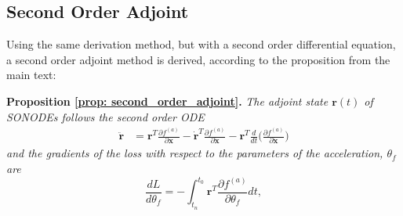 \documentclass{article}
\theoremstyle{remark}
\theoremstyle{definition}
\begin{document}
\subsection{Second Order Adjoint}

Using the same derivation method, but with a second order differential equation, a second order adjoint method is derived, according to the proposition from the main text:

\textbf{Proposition \ref{prop: second_order_adjoint}.}\textit{
The adjoint state $\mathbf{r}(t)$ of SONODEs follows the second order ODE
\begin{equation}
\begin{aligned}
    \ddot{\mathbf{r}} &= \mathbf{r}^{T}\frac{\partial f^{(a)}}{\partial \mathbf{x}}
    -\dot{\mathbf{r}}^{T}\frac{\partial f^{(a)}}{\partial \dot{\mathbf{x}}}
    -\mathbf{r}^{T}\frac{d}{dt}\Biggr(\frac{\partial f^{(a)}}{\partial \dot{\mathbf{x}}}\Biggr)
\end{aligned}
\end{equation}
and the gradients of the loss with respect to the parameters of the acceleration, $\theta_{f}$ are 
\begin{equation}
    \frac{dL}{d\theta_{f}} = -\int_{t_{n}}^{t_{0}}\mathbf{r}^{T}\frac{\partial f^{(a)}}{\partial \theta_{f}}dt,
\end{equation}
}
\end{document}
